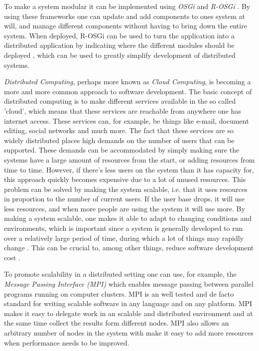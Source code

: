\documentclass{article}
\begin{document}
To make a system modular it can be implemented using \emph{OSGi} and
\emph{R-OSGi} \cite{rellermeyer2007services} \cite{marples2001open}. By using these frameworks one can
update and add components to ones system at will, and manage different
components without having to bring down the entire system. When deployed,
R-OSGi can be used to turn the application into a distributed application by
indicating where the different modules should be deployed
\cite{rellermeyer2007r}, which can be used to greatly simplify development of
distributed systems.

\emph{Distributed Computing}, perhaps more known as \emph{Cloud Computing}, is becoming a
more and more common approach to software development. The basic concept of
distributed computing is to make different services available in the so called
'cloud', which means that these services are reachable from anywhere one has
internet access. These services can, for example, be things like e-mail,
document editing, social networks and much more. The fact that these services
are so widely distributed places high demands on the number of users that can
be supported. These demands can be accommodated by simply making sure the
systems have a large amount of resources from the start, or adding resources
from time to time. However, if there's less users on the system than it has
capacity for, this approach quickly becomes expensive due to a lot of unused
resources. This problem can be solved by making the system scalable, i.e. that
it uses resources in proportion to the number of current users. If the user
base drops, it will use less resources, and when more people are using the
system it will use more. By making a system scalable, one makes it able to
adapt to changing conditions and environments, which is important since a
system is generally developed to run over a relatively large period of time,
during which a lot of things may rapidly change \cite{van1998software}
\cite{caruso1997toward}. This can be crucial to, among other things, reduce
software development cost \cite{fayad2005towards}.

To promote scalability in a distributed setting one can use, for example, the
\emph{Message Passing Interface (MPI)} which enables message passing between
parallel programs running on computer clusters. MPI is
an well tested and de facto standard for writing scalable software in any
language and on any platform. MPI makes it easy to delegate work in an
scalable and distributed environment and at the same time collect the results
form different nodes. MPI also allows an arbitrary number of nodes in the 
system with make it easy to add more resources when performance needs to
be improved. \cite{gropp1996high}
 
\end{document}
